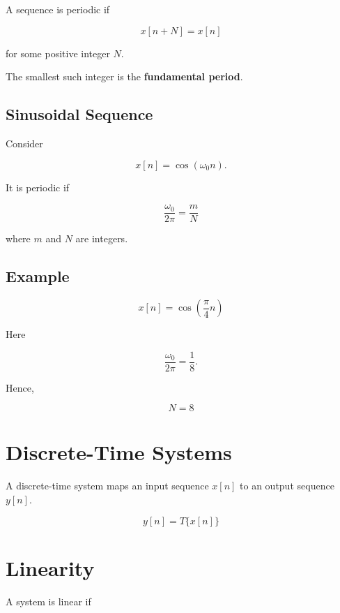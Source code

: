 A sequence is periodic if

\[
\boxed{
x[n+N]=x[n]
}
\]

for some positive integer \(N\).

The smallest such integer is the \textbf{fundamental period}.


\subsection{Sinusoidal Sequence}

Consider

\[
x[n]=\cos(\omega_0 n).
\]

It is periodic if

\[
\boxed{
\frac{\omega_0}{2\pi}=\frac{m}{N}
}
\]

where \(m\) and \(N\) are integers.


\subsection{Example}

\[
x[n]=\cos\left(\frac{\pi}{4}n\right)
\]

Here

\[
\frac{\omega_0}{2\pi}=\frac{1}{8}.
\]

Hence,

\[
\boxed{
N=8
}
\]


\section{Discrete-Time Systems}

A discrete-time system maps an input sequence \(x[n]\) to an output sequence
\(y[n]\).

\[
\boxed{
y[n]=T\{x[n]\}
}
\]


\section{Linearity}

A system is linear if

